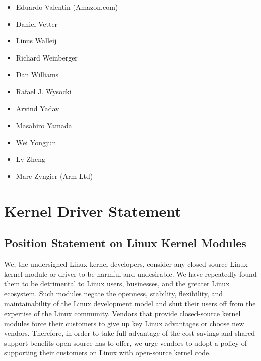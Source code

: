 \documentclass[a4paper,8pt,english]{sphinxmanual}
\begin{document}
\begin{itemize}
\item {} 
Eduardo Valentin (Amazon.com)

\item {} 
Daniel Vetter

\item {} 
Linus Walleij

\item {} 
Richard Weinberger

\item {} 
Dan Williams

\item {} 
Rafael J. Wysocki

\item {} 
Arvind Yadav

\item {} 
Masahiro Yamada

\item {} 
Wei Yongjun

\item {} 
Lv Zheng

\item {} 
Marc Zyngier (Arm Ltd)

\end{itemize}


\chapter{Kernel Driver Statement}
\label{process/kernel-driver-statement:kernel-driver-statement}\label{process/kernel-driver-statement::doc}

\section{Position Statement on Linux Kernel Modules}
\label{process/kernel-driver-statement:position-statement-on-linux-kernel-modules}
We, the undersigned Linux kernel developers, consider any closed-source
Linux kernel module or driver to be harmful and undesirable. We have
repeatedly found them to be detrimental to Linux users, businesses, and
the greater Linux ecosystem. Such modules negate the openness,
stability, flexibility, and maintainability of the Linux development
model and shut their users off from the expertise of the Linux
community. Vendors that provide closed-source kernel modules force their
customers to give up key Linux advantages or choose new vendors.
Therefore, in order to take full advantage of the cost savings and
shared support benefits open source has to offer, we urge vendors to
adopt a policy of supporting their customers on Linux with open-source
kernel code.
\end{document}
